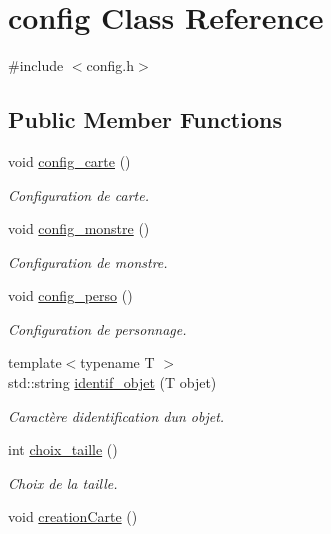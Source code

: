 \hypertarget{classconfig}{}\section{config Class Reference}
\label{classconfig}


{\ttfamily \#include $<$config.\+h$>$}

\subsection*{Public Member Functions}
\begin{DoxyCompactItemize}
\item 
void \hyperlink{classconfig_a346b395fb2b184ce5df6e016373573cf}{config\+\_\+carte} ()
\begin{DoxyCompactList}\small\item\em Configuration de carte. \end{DoxyCompactList}\item 
void \hyperlink{classconfig_ac7075cb352a6843ae07b907a40d2a8eb}{config\+\_\+monstre} ()
\begin{DoxyCompactList}\small\item\em Configuration de monstre. \end{DoxyCompactList}\item 
void \hyperlink{classconfig_a4b425e40339f3e57e41b38677ec4cc5a}{config\+\_\+perso} ()
\begin{DoxyCompactList}\small\item\em Configuration de personnage. \end{DoxyCompactList}\item 
{\footnotesize template$<$typename T $>$ }\\std\+::string \hyperlink{classconfig_acf29a316025d6a8f05219a1f95f6d272}{identif\+\_\+objet} (T objet)
\begin{DoxyCompactList}\small\item\em Caractère d\textquotesingle{}identification d\textquotesingle{}un objet. \end{DoxyCompactList}\item 
int \hyperlink{classconfig_a4125b70dd7204927a1abf06342a934a9}{choix\+\_\+taille} ()
\begin{DoxyCompactList}\small\item\em Choix de la taille. \end{DoxyCompactList}\item 
void \hyperlink{classconfig_a74e51912220c662f35a45146e8ea4d41}{creation\+Carte} ()

\end{DoxyCompactItemize}
